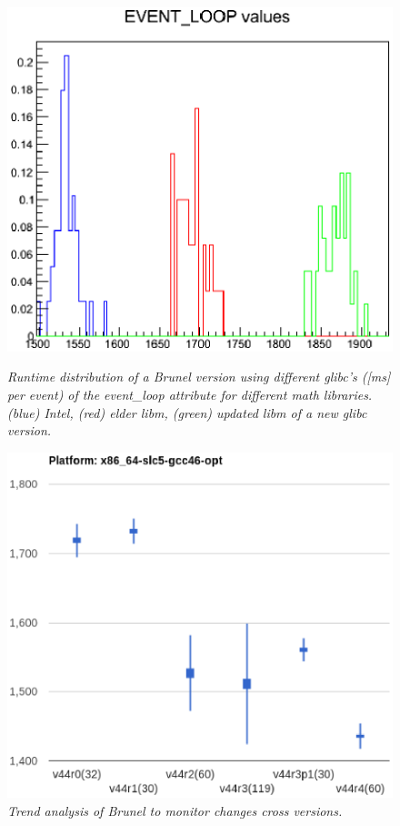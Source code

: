 \documentclass[a4paper]{jpconf}
\begin{document}
\begin{figure}[t]
\begin{minipage}[t]{17pc}
\includegraphics[scale=0.50]{figures/brunel_basic_libm.eps}
\caption{\small \textit{Runtime distribution of a Brunel version using different glibc's ([ms] per event) of the event\_loop attribute for different math libraries. (blue) Intel, (red) elder libm, (green) updated libm of a new glibc version.}}
\label{fig:brunel_basic_libm}
\end{minipage}\hspace{1pc}
\begin{minipage}[t]{17pc}
\includegraphics[scale=0.43]{figures/brunel_trend_analysis.eps}
\caption{\small \textit{Trend analysis of Brunel to monitor changes cross versions.}}
\label{fig:brunel_trend}
\end{minipage}
\end{figure}
\end{document}
